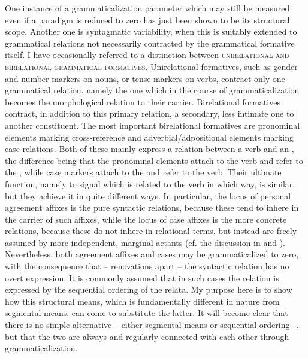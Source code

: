 One instance of a grammaticalization parameter which may still be measured even if a paradigm is reduced to zero has just been shown to be its structural scope. Another one is syntagmatic variability, when this is suitably extended to grammatical relations not necessarily contracted by the grammatical formative itself. I have occasionally referred to a distinction between \textsc{unirelational and birelational grammatical formatives}. Unirelational formatives, such as gender and number markers on nouns, or tense markers on verbs, contract only one grammatical relation, namely the one which in the course of grammaticalization becomes the morphological relation to their carrier. Birelational formatives contract, in addition to this primary relation, a secondary, less intimate one to another constituent. The most important birelational formatives are pronominal elements marking cross-reference and adverbial/adpositional elements marking case relations. Both of these mainly express a relation between a verb and an \np, the difference being that the pronominal elements attach to the verb and refer to the \np, while case markers attach to the \np and refer to the verb. Their ultimate function, namely to signal which \np is related to the verb in which way, is similar, but they achieve it in quite different ways. In particular, the locus of personal agreement affixes is the pure syntactic relations, because these tend to inhere in the carrier of such affixes, while the locus of case affixes is the more concrete relations, because these do not inhere in relational terms, but instead are freely assumed by more independent, marginal actants (cf. the discussion in  and \citealt[§4]{Lehmann1983}). Nevertheless, both agreement affixes and cases may be grammaticalized to zero, with the consequence that -- renovations apart -- the syntactic relation has no overt expression. It is commonly assumed that in such cases the relation is expressed by the sequential ordering of the relata. My purpose here is to show how this structural means, which is fundamentally different in nature from segmental means, can come to substitute the latter. It will become clear that there is no simple alternative -- either segmental means or sequential ordering --, but that the two are always and regularly connected with each other through grammaticalization.

